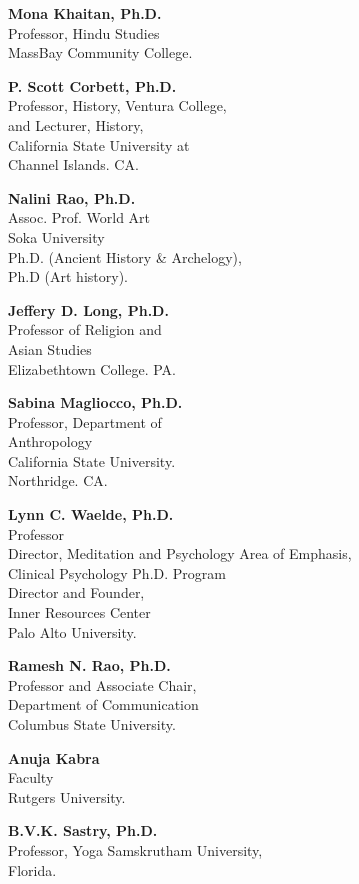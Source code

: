 \begin{multicols}{2}
\begin{trivlist}
\item \textbf{Mona Khaitan, Ph.D.}\\ 
Professor, Hindu Studies\\
MassBay Community College.
 
\item \textbf{P. Scott Corbett, Ph.D.}\\ 
Professor, History, Ventura College,\\ 
and Lecturer, History,\\ 
California State University at\\ 
Channel Islands. CA. 
 
\item \textbf{Nalini Rao, Ph.D.}\\ 
Assoc. Prof. World Art\\
Soka University\\
Ph.D. (Ancient History \& Archelogy),\\ Ph.D (Art history).
\vfill
 
\item \textbf{Jeffery D. Long, Ph.D.}\\ 
Professor of Religion and\\ Asian Studies\\
Elizabethtown College. PA.
 
\item \textbf{Sabina Magliocco, Ph.D.}\\ 
Professor, Department of\\ Anthropology\\
California State University.\\ Northridge. CA. 
 
\item \textbf{Lynn C. Waelde, Ph.D.}\\ 
Professor\\
Director, Meditation and Psychology Area of Emphasis,\\[2pt] 
Clinical Psychology Ph.D. Program\\[2pt]
Director and Founder,\\ Inner Resources Center\\[2pt]
Palo Alto University.
 
\item \textbf{Ramesh N. Rao, Ph.D.}\\ 
Professor and Associate Chair,\\
Department of Communication\\
Columbus State University.
 
\item \textbf{Anuja Kabra}\\ 
Faculty\\
Rutgers University.
 
\item \textbf{B.V.K. Sastry, Ph.D.}\\ 
Professor, Yoga Samskrutham University,\\ 
Florida. 
\end{trivlist}
\end{multicols}

